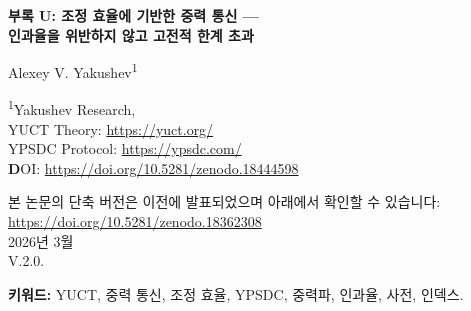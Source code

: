 \documentclass[12pt,a4paper]{article}
\newcommand{\Keff}{K_{\mathrm{eff}}}
\begin{document}
	
	\begin{titlepage}
		\begin{center}
			\vspace*{1cm}
			\Huge \textbf{부록 U: 조정 효율에 기반한 중력 통신 — \\ 인과율을 위반하지 않고 고전적 한계 초과}
			
			\vspace{1cm}
			\Large Alexey V. Yakushev\textsuperscript{1}
			
			\vspace{0.5cm}
			\large \textsuperscript{1}Yakushev Research, \\
			YUCT Theory: \url{https://yuct.org/}\\
			YPSDC Protocol: \url{https://ypsdc.com/}\\
			
			\vspace{2cm}
			\textbf DOI: \url{https://doi.org/10.5281/zenodo.18444598}\\
			
			\vspace{1cm}
			
			\vspace{0cm}
			\large 
			본 논문의 단축 버전은 이전에 발표되었으며 아래에서 확인할 수 있습니다:\\ \url{https://doi.org/10.5281/zenodo.18362308}\\
			\vspace{1cm}
			2026년 3월 \\ \large V.2.0.
			
			\newpage
			\vspace{2cm}
			\begin{abstract}
				\noindent
				우리는 Yakushev 통합 조정 이론(YUCT)에 기반한 장거리 통신의 새로운 접근법을 제안한다. 중력장을 자연적으로 존재하는 전역 사전으로 취급함으로써, 짧은 인덱스(중력 섭동)가 원거리 관찰자 간 상태를 조정할 수 있음을 보여준다. 그 유효 효율 \(\Keff\)은 형식적으로 광속 한계를 초과하지만 인과율을 위반하지는 않는다. 핵심은 오프라인 사전 분배(기존 중력장)와 온라인 인덱스 전송(광속 중력파)의 분리에 있다. 중력파는 물질을 감쇠 없이 투과하여 전자기 신호에 비해 중요한 이점을 제공한다. 우리는 기본 방정식을 유도하고, 달성 가능한 효율을 추정하며, 고정밀 중력계를 이용한 실험적 검증을 제안한다. 이 연구는 지연이 거리가 아닌 국소 처리에 의해 결정되는 새로운 종류의 통신 시스템으로의 길을 연다.
			\end{abstract}
			
			\vspace{0.5cm}
			\noindent \textbf{키워드:} YUCT, 중력 통신, 조정 효율, YPSDC, 중력파, 인과율, 사전, 인덱스.
		\end{center}
	\end{titlepage}
	
\end{document}
